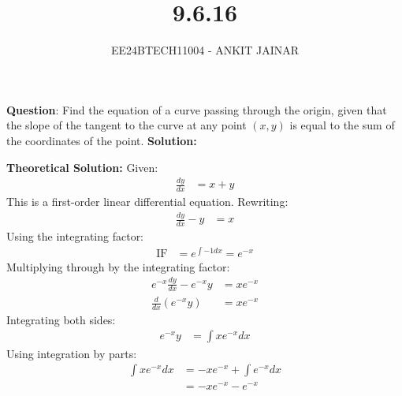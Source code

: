 \documentclass[journal]{IEEEtran}
\begin{document}

\vspace{3cm}

\title{9.6.16}
\author{EE24BTECH11004 - ANKIT JAINAR}
{\let\newpage\relax\maketitle}

\renewcommand{\thefigure}{\theenumi}
\renewcommand{\thetable}{\theenumi}
\setlength{\intextsep}{10pt} %

\renewcommand{\thetable}{\theenumi}

\textbf{Question}:
Find the equation of a curve passing through the origin, given that the slope of the tangent to the curve at any point $(x, y)$ is equal to the sum of the coordinates of the point.
\newline
\textbf{Solution:}
\newline
\begin{table}[h!]    
  \centering
  
  \label{tab1.1.2.2}
\end{table}
\newline
\textbf{Theoretical Solution:}
\newline
Given:
\begin{align}
    \frac{dy}{dx} &= x + y
\end{align}
This is a first-order linear differential equation. Rewriting:
\begin{align}
    \frac{dy}{dx} - y &= x
\end{align}
\newline
Using the integrating factor:
\begin{align}
    \text{IF} &= e^{\int -1 dx} = e^{-x}
\end{align}
Multiplying through by the integrating factor:
\begin{align}
    e^{-x} \frac{dy}{dx} - e^{-x}y &= xe^{-x} \\
    \frac{d}{dx}\left(e^{-x}y\right) &= xe^{-x}
\end{align}
\newline
Integrating both sides:
\begin{align}
    e^{-x}y &= \int xe^{-x} dx
\end{align}
Using integration by parts:
\begin{align}
    \int xe^{-x} dx &= -xe^{-x} + \int e^{-x} dx \\
    &= -xe^{-x} - e^{-x}
\end{align}
\end{document}
